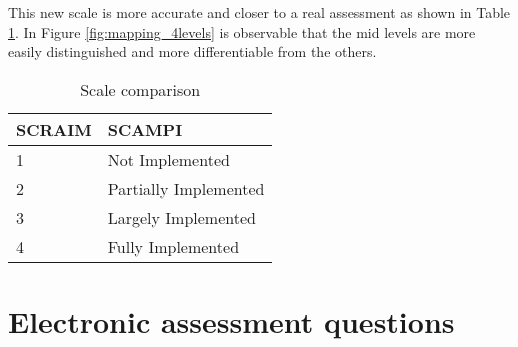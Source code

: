 This new scale is more accurate and closer to a real assessment as shown in Table \ref{tab:rules}. In Figure \ref{fig:mapping_4levels} is observable that the mid levels are more easily distinguished and more differentiable from the others.

\begin{table}[h]
	\centering
	\caption{Scale comparison}
	\begin{tabular}{|p{2cm}|p{4cm}|}
		\hline
		SCRAIM   & SCAMPI    \\
		\hline
		1 & Not Implemented\\
				\hline
				2 & Partially Implemented\\
				\hline
				3 & Largely Implemented\\
				\hline
				4 & Fully Implemented\\
				\hline
	\end{tabular}
	\label{tab:rules}
\end{table}

\newpage














\section{Electronic assessment questions} \label{sec:question}

